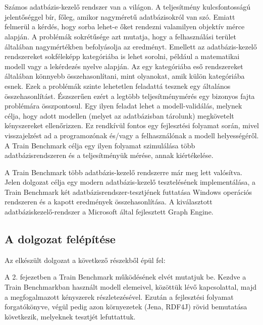 \chapter{\bevezetes}

Számos adatbázis-kezelő rendszer van a világon. A teljesítmény kulcsfontosságú jelentőséggel bír, főleg, amikor nagyméretű adatbázisokról van szó. Emiatt felmerül a kérdés, hogy sorba lehet-e őket rendezni valamilyen objektív mérce alapján. A problémák sokrétűsége azt mutatja, hogy a felhasználási terület általában nagymértékben befolyásolja az eredményt. Emellett az adatbázis-kezelő rendszereket sokféleképp kategóriába is lehet sorolni, például a matematikai modell vagy a lekérdezés nyelve alapján. Az egy kategóriába eső rendszereket általában könnyebb összehasonlítani, mint olyanokat, amik külön kategóriába esnek. Ezek a problémák szinte lehetetlen feladattá tesznek egy általános összehasonlítást. Észszerűen ezért a legtöbb teljesítménymérés egy bizonyos fajta problémára összpontosul. Egy ilyen feladat lehet a modell-validálás, melynek célja, hogy adott modellen (melyet az adatbázisban tárolunk) megkövetelt kényszereket ellenőrizzen. Ez rendkívül fontos egy fejlesztési folyamat során, mivel visszajelzést ad a programozónak és/vagy a felhasználónak a modell helyességéről. A Train Benchmark célja egy ilyen folyamat szimulálása több adatbázisrendszeren és a teljesítményük mérése, annak kiértékelése.

A Train Benchmark több adatbázis-kezelő rendszerre már meg lett valósítva. Jelen dolgozat célja egy modern adatbázis-kezelő tesztelésének implementálása, a Train Benchmark két adatbázisrendszer-tesztjének futtatása Windows operációs rendszeren és a kapott eredmények összehasonlítása. A kiválasztott adatbáziskezelő-rendszer a Microsoft által fejlesztett Graph Engine.

\section{A dolgozat felépítése}

Az elkészült dolgozat a következő részekből épül fel:

A 2. fejezetben a Train Benchmark működésének elvét mutatjuk be. Kezdve a Train Benchmarkban használt modell elemeivel, közöttük lévő kapcsolattal, majd a megfogalmazott kényszerek részletezésével. Ezután a fejlesztési folyamat forgatókönyve, végül pedig azon környezetek (Jena, RDF4J) rövid bemutatása következik, melyeknek tesztjét lefuttattuk.

